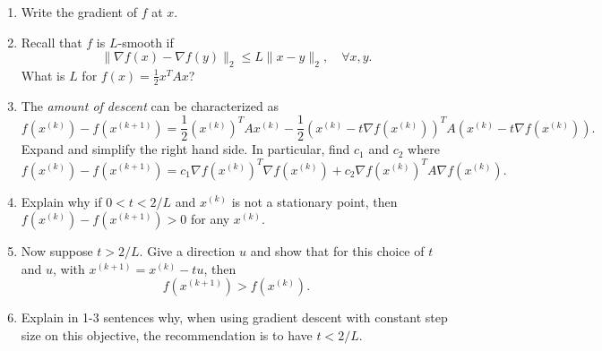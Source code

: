 \documentclass{article}
\begin{document}
\begin{enumerate}
	\begin{enumerate}
		\item Write the gradient of $f$ at $x$. 
		\item Recall that $f$ is $L$-smooth if 
		\[
		\|\nabla f(x) - \nabla f(y)\|_2 \leq L\|x-y\|_2, \quad \forall x,y.
		\]
		What is $L$ for $f(x) = \frac{1}{2} x^TAx$?
		\item The \emph{amount of descent} can be characterized as 
		\[
		f(x^{(k)}) - f(x^{(k+1)}) = \frac{1}{2} (x^{(k)})^TAx^{(k)} - \frac{1}{2} (x^{(k)}-t\nabla f(x^{(k)}))^TA(x^{(k)}-t\nabla f(x^{(k)})).
		\]
		Expand and simplify the right hand side. In particular, find $c_1$ and $c_2$ where 
		\[
		f(x^{(k)}) - f(x^{(k+1)}) = c_1 \nabla f(x^{(k)})^T\nabla f(x^{(k)}) + c_2 \nabla f(x^{(k)})^TA\nabla f(x^{(k)}).
		\]
		\item Explain why if $0 < t < 2/L$ and $x^{(k)}$ is not a stationary point, then $f(x^{(k)}) - f(x^{(k+1)}) > 0$ for any $x^{(k)}$.
		\item Now suppose $t > 2/L$. Give a direction $u$ and show that for this choice of $t$ and $u$, with $x^{(k+1)} = x^{(k)} - tu$, then
		\[
		f(x^{(k+1)})   > f(x^{(k)}).
		\]
		\item Explain in 1-3 sentences why, when using gradient descent with constant step size on this objective, the recommendation is to have $t < 2/L$.
	\end{enumerate}
\end{enumerate}
\end{document}
